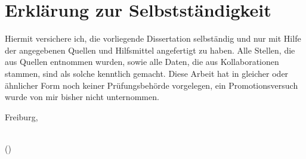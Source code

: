 \chapter*{Erklärung zur Selbstständigkeit}
Hiermit versichere ich, die vorliegende Dissertation selbständig und nur mit Hilfe der angegebenen Quellen und Hilfsmittel angefertigt zu haben.
Alle Stellen, die aus Quellen entnommen wurden, sowie alle Daten, die aus Kollaborationen stammen, sind als solche kenntlich gemacht.
Diese Arbeit hat in gleicher oder ähnlicher Form noch keiner Prüfungsbehörde vorgelegen, ein Promotionsversuch wurde von mir bisher nicht unternommen.

\bigskip{}

Freiburg, \pubdate %

\bigskip{}
\bigskip{}
\bigskip{}

\makebox[6cm]{\hrulefill}\\
(\authorname)
\thispagestyle{empty} %